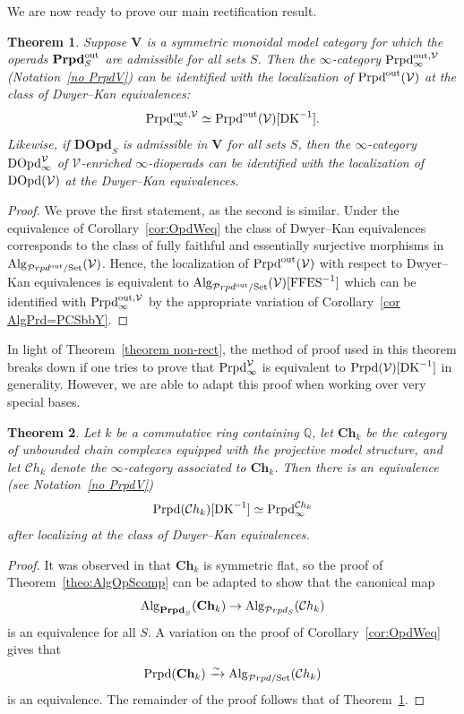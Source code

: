 \documentclass{amsart}
\newtheorem{theorem}{Theorem}
\numberwithin{theorem}{subsection}
\newtheorem{thm}[theorem]{Theorem}
\theoremstyle{definition}
\newcommand{\xV}{\mathcal{V}}
\newcommand{\isoto}{\xrightarrow{\sim}}
\newcommand{\name}[1]{\ensuremath{\text{\textup{#1}}}}
\newcommand{\Set}{\name{Set}}
\newcommand{\Alg}{\name{Alg}}
\newcommand{\AlgPrdSet}{\name{Alg}_{\mathcal{P}rpd/\Set}}
\newcommand{\calproperad}{\mathcal{P}rpd}
\newcommand{\bfproperad}{\mathbf{Prpd}}
\newcommand{\nmproperad}{\name{Prpd}}
\begin{document}
We are now ready to prove our main rectification result.

\begin{thm}\label{thm:rect}
Suppose $\mathbf{V}$ is a symmetric monoidal model category for which the operads $\bfproperad^{\name{out}}_{S}$ are admissible for all sets $S$.
Then the $\infty$-category $\nmproperad^{{\name{out}},\xV}_\infty$ (Notation~\ref{no PrpdV}) can be identified with the localization of $\nmproperad^{\name{out}}(\xV)$ at the class of Dwyer--Kan equivalences:
\[
	\nmproperad^{{\name{out}},\xV}_\infty \simeq \nmproperad^{\name{out}}(\xV)[\name{DK}^{-1}].
\]
Likewise, if $\mathbf{DOpd}_S$ is admissible in $\mathbf{V}$ for all sets $S$, then the $\infty$-category $\name{DOpd}^\xV_\infty$ of $\xV$-enriched $\infty$-dioperads can be identified with the localization of $\name{DOpd}(\xV)$ at the Dwyer--Kan equivalences.
\end{thm}
\begin{proof}
	We prove the first statement, as the second is similar.
	Under the equivalence of Corollary~\ref{cor:OpdWeq} the class of Dwyer--Kan equivalences corresponds to the class of fully faithful and essentially surjective morphisms in $\Alg_{\calproperad^{\name{out}}/\name{Set}}(\mathbf{\xV})$. 
	Hence, the localization of $\nmproperad^{\name{out}}(\xV)$ with respect to Dwyer--Kan equivalences is equivalent to $\Alg_{\calproperad^{\name{out}}/\name{Set}}(\mathbf{\xV})[\name{FFES}^{-1}]$ which can be identified with $\nmproperad^{{\name{out}},\xV}_\infty$ by the appropriate variation of Corollary~\ref{cor AlgPrd=PCSbbY}.
\end{proof}

In light of Theorem~\ref{theorem non-rect}, the method of proof used in this theorem breaks down if one tries to prove that $\nmproperad_\infty^\xV$ is equivalent to $\nmproperad(\xV)[\name{DK}^{-1}]$ in generality.
However, we are able to adapt this proof when working over very special bases.

\begin{theorem}\label{theorem rational rectification for properads}
Let $k$ be a commutative ring containing $\mathbb{Q}$, let $\mathbf{Ch}_k$ be the category of unbounded chain complexes equipped with the projective model structure, and let $\mathcal{C}h_k$ denote the $\infty$-category associated to $\mathbf{Ch}_k$.
Then there is an equivalence (see Notation~\ref{no PrpdV})
\[
	\nmproperad(\mathcal{C}h_k)[\name{DK}^{-1}] \simeq \nmproperad_\infty^{\mathcal{C}h_k}
\]
after localizing at the class of Dwyer--Kan equivalences.
\end{theorem}
\begin{proof}
It was observed in \cite[\S7.4]{PavlovScholbachSymm} that $\mathbf{Ch}_k$ is symmetric flat, so the proof of Theorem~\ref{theo:AlgOpScomp} can be adapted to show that the canonical map
\[\Alg_{\mathbf{Prpd}_S}(\mathbf{Ch}_k)\to \Alg_{\calproperad_S}(\mathcal{C}h_k) \]
is an equivalence for all $S$.
A variation on the proof of Corollary~\ref{cor:OpdWeq} gives that
\[\nmproperad(\mathbf{Ch}_k) \isoto \AlgPrdSet(\mathcal{C}h_k)\] 
is an equivalence.
The remainder of the proof follows that of Theorem~\ref{thm:rect}.
\end{proof}
\end{document}
